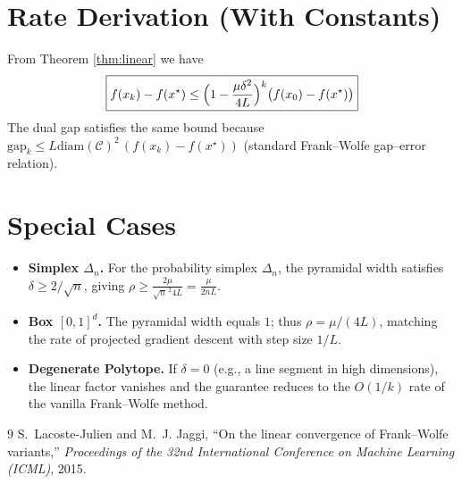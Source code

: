 \documentclass{article}
\newcommand{\cC}{\mathcal{C}}
\newcommand{\gap}{\mathrm{gap}}
\newcommand{\diam}{\mathrm{diam}}
\begin{document}
\section*{Rate Derivation (With Constants)}
From Theorem \ref{thm:linear} we have
\[
\boxed{
f(x_k)-f(x^\star)\le
\Bigl(1-\frac{\mu\delta^{2}}{4L}\Bigr)^{k}
\bigl(f(x_0)-f(x^\star)\bigr)
}
\]
The dual gap satisfies the same bound because $\gap_k\le L\diam(\cC)^{2}\,(f(x_k)-f(x^\star))$ (standard Frank–Wolfe gap–error relation).

\section*{Special Cases}
\begin{itemize}
\item \textbf{Simplex $\Delta_{n}$.} For the probability simplex $\Delta_n$, the pyramidal width satisfies $\delta\ge 2/\sqrt{n}$, giving $\rho\ge \frac{2\mu}{\sqrt{n}^{\,2}4L}=\frac{\mu}{2nL}$.
\item \textbf{Box $[0,1]^d$.} The pyramidal width equals $1$; thus $\rho=\mu/(4L)$, matching the rate of projected gradient descent with step size $1/L$.
\item \textbf{Degenerate Polytope.} If $\delta=0$ (e.g., a line segment in high dimensions), the linear factor vanishes and the guarantee reduces to the $O(1/k)$ rate of the vanilla Frank–Wolfe method.
\end{itemize}

\begin{thebibliography}{9}
S.~Lacoste-Julien and M.~J. Jaggi, ``On the linear convergence of
  {F}rank–{W}olfe variants,'' \emph{Proceedings of the 32nd International
  Conference on Machine Learning (ICML)}, 2015.
\end{thebibliography}
\end{document}
